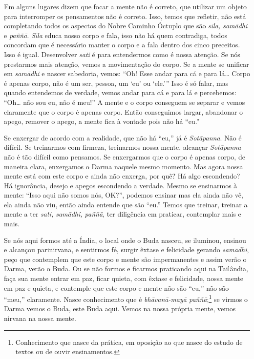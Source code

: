 Em alguns lugares dizem que focar a mente não é correto, que
utilizar um objeto para interromper os pensamentos não é correto. Isso,
temos que refletir, não está completando todos os aspectos do Nobre
Caminho Óctuplo que são \emph{sīla, samādhi} e\emph{ paññā}.
\emph{Sīla} educa nosso corpo e fala, isso não há quem contradiga,
todos concordam que é necessário manter o corpo e a fala dentro dos
cinco preceitos. Isso é igual. Desenvolver \emph{sati} é para
entendermos como é nossa atenção. Se nós prestarmos mais atenção, vemos
a movimentação do corpo. Se a mente se unificar em \emph{samādhi} e
nascer sabedoria, vemos: “Oh! Esse andar para cá e para lá\ldots{} Corpo é
apenas corpo, não é um ser, pessoa, um ‘eu’ ou ‘ele.’” Isso é só falar,
mas quando entendemos de verdade, vemos andar para cá e para lá e
percebemos: “Oh\ldots{} não sou eu, não é meu!” A mente e o corpo conseguem se
separar e vemos claramente que o corpo é apenas corpo. Então
conseguimos largar, abandonar o apego, remover o apego, a mente fica à
vontade pois não há “eu.” 

Se enxergar de acordo com a realidade, que não há “eu,” já é
\emph{Sotāpanna}. Não é difícil. Se treinarmos com firmeza,
treinarmos nossa mente, alcançar \emph{Sotāpanna} não é tão difícil
como pensamos. Se enxergarmos que o corpo é apenas corpo, de maneira
clara, enxergamos o Darma naquele mesmo momento. Mas agora nossa mente
está com este corpo e ainda não enxerga, por quê? Há algo escondendo?
Há ignorância, desejo e apegos escondendo a verdade. Mesmo se
ensinarmos à mente: “Isso aqui não somos nós, \textsc{OK}?”, podemos ensinar mas
ela ainda não vê, ela ainda não viu, então ainda entende que são “eu.”
Temos que treinar, treinar a mente a ter \emph{sati, samādhi,
paññā}, ter diligência em praticar, contemplar mais e mais. 

Se nós aqui formos até a Índia, o local onde o Buda nasceu, se
iluminou, ensinou e alcançou parinirvana, e sentirmos fé, surgir êxtase
e felicidade gerando \emph{samādhi}, peço que contemplem que este
corpo e mente são impermanentes e assim verão o Darma, verão o Buda. Ou
se não formos e ficarmos praticando aqui na Tailândia, faça sua mente
entrar em paz, ficar quieta, com êxtase e felicidade, nossa mente em
paz e quieta, e contemple que este corpo e mente não são “eu,” não são
“meu,” claramente. Nasce conhecimento que é \emph{bhāvanā-mayā
paññā};\footnote{Conhecimento que nasce da prática, em oposição ao que
nasce do estudo de textos ou de ouvir ensinamentos.} se virmos o Darma
vemos o Buda, este Buda aqui. Vemos na nossa própria mente, vemos
nirvana na nossa mente. 

